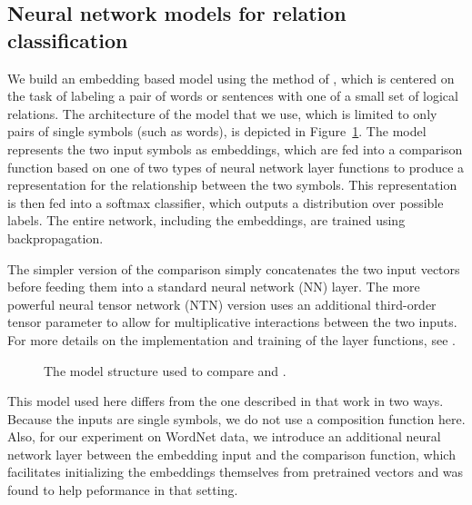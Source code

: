 
\subsection*{Neural network models for relation classification} \label{methods}

We build an embedding based model using the method of
\cite{Bowman:Potts:Manning:2014}, which is centered on the task of
labeling a pair of words or sentences with one of a small set of
logical relations. The architecture of the model that we use, which is
limited to only pairs of single symbols (such as words), is depicted
in Figure~\ref{sample-figure}. The model represents the two input
symbols as embeddings, which are fed into a comparison function based
on one of two types of neural network layer functions to produce a
representation for the relationship between the two symbols. This
representation is then fed into a softmax classifier, which outputs a
distribution over possible labels. The entire network, including the
embeddings, are trained using backpropagation. 

The simpler version of the comparison simply concatenates the two input
vectors before feeding them into a standard neural network (NN) layer.
The more powerful neural tensor network (NTN) version uses an additional 
third-order tensor parameter to allow for multiplicative
interactions between the two inputs. For more details on the implementation and
training of the layer functions, see \cite{Bowman:Potts:Manning:2014}.

\begin{figure}[tp]
  \centering
  
  \caption{The model structure used to compare  and .} 
  \label{sample-figure}
\end{figure}

This model used here differs from the one described in that work in
two ways. Because the inputs are single symbols, we do not use
a composition function here. Also, for our experiment on WordNet data, 
we introduce an additional neural network layer between the embedding 
input and the comparison function, which facilitates initializing the 
embeddings themselves from pretrained vectors and was found to help 
peformance in that setting.


